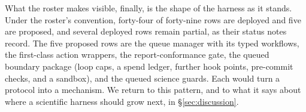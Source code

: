 What the roster makes visible, finally, is the shape of the harness as it
stands. Under the roster's convention, forty-four of forty-nine
rows\prov{} are deployed and five are proposed, and several deployed rows
remain partial, as their status notes record. The five proposed rows are
the queue manager with its typed workflows, the first-class action
wrappers, the report-conformance gate, the queued boundary package (loop
caps, a spend ledger, further hook points, pre-commit checks, and a
sandbox), and the queued science guards. Each would turn a protocol into a
mechanism. We return to this pattern, and to what it says about where a
scientific harness should grow next, in \S\ref{sec:discussion}.
